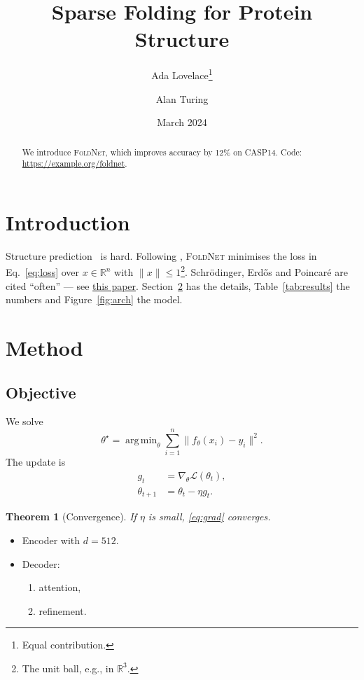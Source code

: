 \documentclass[11pt]{article}
\title{Sparse Folding for Protein Structure}
\author{Ada Lovelace\thanks{Equal contribution.} \and Alan Turing}
\date{March 2024}
\newcommand{\R}{\mathbb{R}}
\newcommand{\norm}[1]{\lVert #1 \rVert}
\newcommand{\sys}{\textsc{FoldNet}\xspace}
\newcommand*{\eg}{e.g.,\xspace}
\DeclareMathOperator*{\argmin}{arg\,min}
\newtheorem{theorem}{Theorem}
\begin{document}
\maketitle
\begin{abstract}
We introduce \sys, which improves accuracy by 12\% on CASP14. Code: \url{https://example.org/foldnet}.
\end{abstract}

\section{Introduction}\label{sec:intro}
Structure prediction~\cite{jumper2021,baek2021} is hard. Following \citet{jumper2021}, \sys minimises the
loss in Eq.~\eqref{eq:loss} over $x \in \R^n$ with $\norm{x} \le 1$\footnote{The unit ball, \eg in $\R^3$.}.
Schr\"odinger, Erd\H{o}s and Poincar\'e are cited ``often'' --- see \href{https://arxiv.org/abs/1706.03762}{this paper}.
Section~\ref{sec:method} has the details, Table~\ref{tab:results} the numbers and Figure~\ref{fig:arch} the model.

\section{Method}\label{sec:method}
\subsection*{Objective}
We solve
\begin{equation}\label{eq:loss}
  \theta^\star = \argmin_{\theta} \sum_{i=1}^{n} \norm{f_\theta(x_i) - y_i}^2 .
\end{equation}
The update is
\begin{align}
  g_t &= \nabla_\theta \mathcal{L}(\theta_t), \label{eq:grad} \\
  \theta_{t+1} &= \theta_t - \eta g_t . \nonumber
\end{align}
\begin{theorem}[Convergence]\label{thm:conv}
If $\eta$ is small, \eqref{eq:grad} converges.
\end{theorem}
\begin{itemize}
  \item Encoder with $d = 512$.
  \item Decoder:
  \begin{enumerate}
    \item attention,
    \item refinement.
  \end{enumerate}
\end{itemize}
\end{document}
